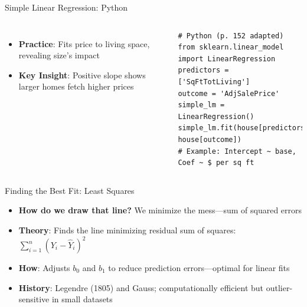 \documentclass{beamer}
\begin{document}
	\begin{frame}[fragile]{Simple Linear Regression: Python}
		\lstset{language=Python}
		\begin{columns}
			\begin{itemize}
				\item \textbf{Practice}: Fits price to living space, revealing size’s impact
				\item \textbf{Key Insight}: Positive slope shows larger homes fetch higher prices
			\end{itemize}
			\begin{lstlisting}
# Python (p. 152 adapted)
from sklearn.linear_model import LinearRegression
predictors = ['SqFtTotLiving']
outcome = 'AdjSalePrice'
simple_lm = LinearRegression()
simple_lm.fit(house[predictors], house[outcome])
# Example: Intercept ~ base, Coef ~ $ per sq ft
			\end{lstlisting}

		\end{columns}
	\end{frame}
	
	\begin{frame}{Finding the Best Fit: Least Squares}
			\begin{itemize}
				 \item \textbf{How do we draw that line?} We minimize the mess—sum of squared errors
				\item \textbf{Theory}: Finds the line minimizing residual sum of squares: $\sum_{i=1}^n (Y_i - \hat{Y}_i)^2$
				\item \textbf{How}: Adjusts $b_0$ and $b_1$ to reduce prediction errors—optimal for linear fits
				\item \textbf{History}: Legendre (1805) and Gauss; computationally efficient but outlier-sensitive in small datasets
			\end{itemize}
		\end{frame}
		
\end{document}
